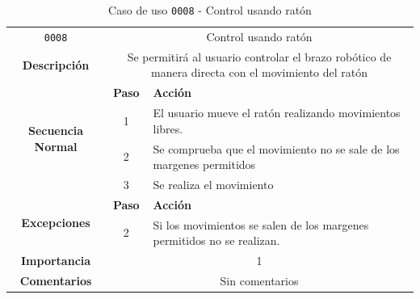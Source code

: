 \begin{table}[H]
    \centering
    \begin{tabularx}{\textwidth}{|c|c|X|}
        \cline{1-3}
        \texttt{0008}        & \multicolumn{2}{c|}{Control usando ratón}                                      
        \\ \cline{1-3}
        \textbf{Descripción} & \multicolumn{2}{m{13cm}|}{Se permitirá al usuario controlar el brazo robótico de manera directa con el movimiento del ratón}
        \\ \cline{1-3}
        \multirow{4}{*}{\textbf{Secuencia Normal}} & \textbf{Paso} & \textbf{Acción}
        \\ \cline{2-3}                    &   1  & El usuario mueve el ratón realizando movimientos libres.
        \\ \cline{2-3}                    &   2  & Se comprueba que el movimiento no se sale de los margenes permitidos
        \\ \cline{2-3}                    &   3  & Se realiza el movimiento
        \\ \cline{1-3}
        \multirow{2}{*}{\textbf{Excepciones}} & \textbf{Paso} & \textbf{Acción}
        \\ \cline{2-3}                    &   2   &  Si los movimientos se salen de los margenes permitidos no se realizan.
        \\ \cline{1-3}
        \textbf{Importancia}                 & \multicolumn{2}{c|}{1}           
        \\ \cline{1-3}
        \textbf{Comentarios}                 & \multicolumn{2}{c|}{Sin comentarios}
        \\ \cline{1-3}
    \end{tabularx}
    \caption{Caso de uso \texttt{0008} - Control usando ratón}
\end{table}

